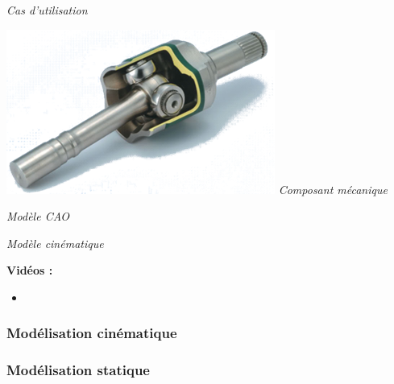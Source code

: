 \documentclass[11pt,oneside]{article}
\begin{document}
\begin{center}
\hfill
\begin{minipage}[c]{.21\linewidth}
\begin{center}
\textit{Cas d'utilisation}
\end{center}
\end{minipage} \hfill
\begin{minipage}[c]{.21\linewidth}
\begin{center}
\includegraphics[width=.9\textwidth]{png/tripode2}
\textit{Composant mécanique \cite{tripode2}}
\end{center}
\end{minipage} \hfill
\begin{minipage}[c]{.21\linewidth}
\begin{center}
\textit{Modèle CAO}
\end{center} 
\end{minipage}\hfill
\begin{minipage}[c]{.21\linewidth}
\begin{center}
\textit{Modèle cinématique}
\end{center} 
\end{minipage}\hfill
\end{center}


\textbf{Vidéos :}
\begin{itemize}
\item
\end{itemize}

\subsubsection{Modélisation cinématique}
\subsubsection{Modélisation statique}
\end{document}
